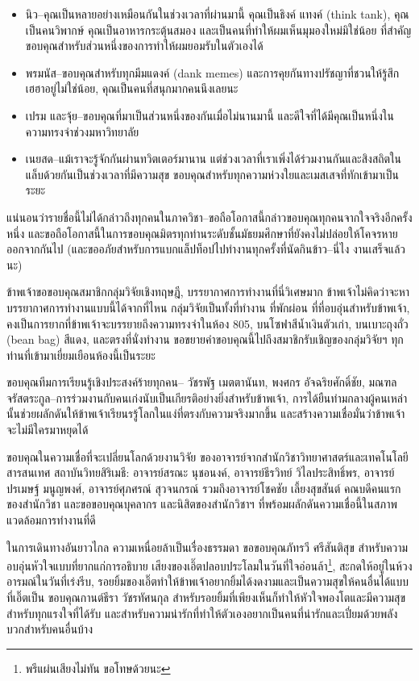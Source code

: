 \begin{itemize}
    \item นิว--คุณเป็นหลายอย่างเหมือนกันในช่วงเวลาที่ผ่านมานี้ คุณเป็นธิงค์ แทงค์ (think tank), คุณเป็นคนวิพากษ์ คุณเป็นอาหารกระตุ้นสมอง และเป็นคนที่ทำให้ผมเห็นมุมองใหม่มิใช่น้อย ที่สำคัญ ขอบคุณสำหรับส่วนหนึ่งของการทำให้ผมยอมรับในตัวเองได้
    \item พรมนัส--ขอบคุณสำหรับทุกมีมแดงค์ (dank memes) และการคุยกันทางปรัชญาที่ชวนให้รู้สึกเฮฮาอยู่ไม่ใช่น้อย, คุณเป็นคนที่สนุกมากคนนึงเลยนะ
    \item เปรม และจุ้ย--ขอบคุณที่มาเป็นส่วนหนึ่งของกันเมื่อไม่นานมานี้ และดีใจที่ได้มีคุณเป็นหนึ่งในความทรงจำช่วงมหาวิทยาลัย
    \item เนยสด--แม้เราจะรู้จักกันผ่านทวิตเตอร์มานาน แต่ช่วงเวลาที่เราเพิ่งได้ร่วมงานกันและสิงสถิตในแล็บด้วยกันเป็นช่วงเวลาที่มีความสุข ขอบคุณสำหรับทุกความห่วงใยและเมสเสจที่ทักเข้ามาเป็นระยะ
\end{itemize}
แน่นอนว่ารายชื่อนี้ไม่ได้กล่าวถึงทุกคนในภาควิชา--ขอถือโอกาสนี้กล่าวขอบคุณทุกคนจากใจจริงอีกครั้งหนึ่ง และขอถือโอกาสนี้ในการขอบคุณมิตรทุกท่านระดับชั้นมัธยมศึกษาที่ยังคงไม่ปล่อยให้โคจรหายออกจากกันไป (และขออภัยสำหรับการแบกแล็ปท็อปไปทำงานทุกครั้งที่นัดกินข้าว--นี่ไง งานเสร็จแล้วนะ)

ข้าพเจ้าขอขอบคุณสมาชิกกลุ่มวิจัยเชิงทฤษฎี, บรรยากาศการทำงานที่นี่วิเศษมาก ข้าพเจ้าไม่คิดว่าจะหาบรรยากาศการทำงานแบบนี้ได้จากที่ไหน กลุ่มวิจัยเป็นทั้งที่ทำงาน ที่พักผ่อน ที่ที่อบอุ่นสำหรับข้าพเจ้า, คงเป็นการยากที่ข้าพเจ้าจะบรรยายถึงความทรงจำในห้อง 805, บนโซฟาสีน้ำเงินตัวเก่า, บนเบาะถุงถั่ว (bean bag) สีแดง, และตรงที่นั่งทำงาน ขอขยายคำขอบคุณนี้ไปถึงสมาชิกรับเชิญของกลุ่มวิจัยฯ ทุกท่านที่เข้ามาเยี่ยมเยือนห้องนี้เป็นระยะ

ขอบคุณทีมการเรียนรู้เชิงประสงค์ร้ายทุกคน--
วัชรพัฐ เมตตานันท, พงศกร อัจฉริยศักดิ์ชัย, มณฑล จรัสตระกูล--การร่วมงานกับคนเก่งนับเป็นเกียรติอย่างยิ่งสำหรับข้าพเจ้า, การได้ยืนท่ามกลางผู้คนเหล่านั้นช่วยผลักดันให้ข้าพเจ้าเรียนรรู้โลกในแง่ที่ตรงกับความจริงมากขึ้น และสร้างความเชื่อมั่นว่าข้าพเจ้าจะไม่มีใครมาหยุดได้

ขอบคุณในความเชื่อที่จะเปลี่ยนโลกด้วยงานวิจัย ของอาจารย์จากสำนักวิชาวิทยาศาสตร์และเทคโนโลยีสารสนเทศ สถาบันวิทยสิริเมธี: อาจารย์สรณะ นุชอนงค์, อาจารย์ธีรวิทย์ วิไลประสิทธิ์พร, อาจารย์ปรเมษฐ์ มนูญพงศ์, อาจารย์ศุภศรณ์ สุวจนกรณ์ รวมถึงอาจารย์โชคชัย เลี้ยงสุขสันต์ คณบดีคนแรกของสำนักวิชา และขอขอบคุณบุคลากร และนิสิตของสำนักวิชาฯ ที่พร้อมผลักดันความเชื่อนี้ในสภาพแวดล้อมการทำงานที่ดี

ในการเดินทางอันยาวไกล ความเหนื่อยล้าเป็นเรื่องธรรมดา ขอขอบคุณภัทรวี ศรีสันติสุข สำหรับความอบอุ่นหัวใจแบบที่ยากแก่การอธิบาย เสียงของเอิ๊ตปลอบประโลมในวันที่ใจอ่อนล้า\footnote{พรีแผ่นเสียงไม่ทัน ขอโทษด้วยนะ}, สะกดให้อยู่ในห้วงอารมณ์ในวันที่เร่งรีบ, รอยยิ้มของเอิ๊ตทำให้ข้าพเจ้าอยากยิ้มได้งดงามและเป็นความสุขให้คนอื่นได้แบบที่เอิ๊ตเป็น ขอบคุณกานต์ธีรา วัชรทัศนกุล สำหรับรอยยิ้มที่เพียงเห็นก็ทำให้หัวใจพองโตและมีความสุข สำหรับทุกแรงใจที่ได้รับ และสำหรับความน่ารักที่ทำให้ตัวเองอยากเป็นคนที่น่ารักและเปี่ยมด้วยพลังบวกสำหรับคนอื่นบ้าง

